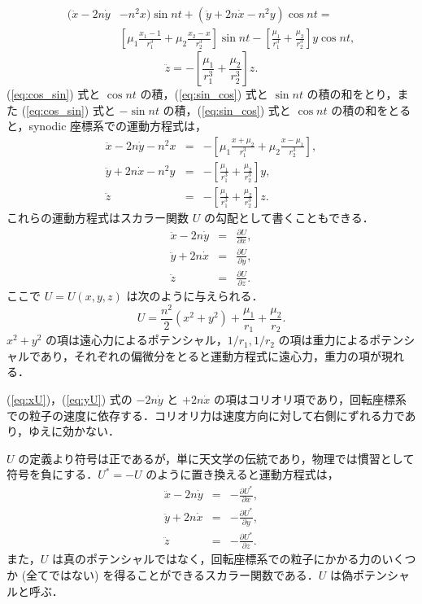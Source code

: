 \documentclass[11pt,a4paper,oneside,onecolumn]{jarticle}
\begin{document}
\begin{equation}
\begin{split}
(\ddot{x} - 2 n \dot{y} & - n^2 x) \sin nt + (\ddot{y} + 2 n \dot{x} - n^2 y) \cos nt =\\
& \left[ \mu_1 \frac{x_1 - 1}{r_1^3} + \mu_2 \frac{x_2 - x}{r_2^3} \right] \sin nt - \left[ \frac{\mu_1}{r_1^3} + \frac{\mu_2}{r_2^3} \right] y \cos nt, \label{eq:sin_cos}
\end{split}
\end{equation}
\begin{equation}
\ddot{z} = - \left[ \frac{\mu_1}{r_1^3} + \frac{\mu_2}{r_2^3} \right] z.
\end{equation}
(\ref{eq:cos_sin}) 式と $\cos nt$ の積，(\ref{eq:sin_cos}) 式と $\sin nt$ の積の和をとり，また (\ref{eq:cos_sin}) 式と $- \sin nt$ の積，(\ref{eq:sin_cos}) 式と $\cos nt$ の積の和をとると，synodic 座標系での運動方程式は，
\begin{eqnarray}
\ddot{x} - 2 n \dot{y} - n^2 x & = & - \left[ \mu_1 \frac{x + \mu_2}{r_1^3} + \mu_2 \frac{x - \mu_1}{r_2^3} \right],\\
\ddot{y} + 2 n \dot{x} - n^2 y & = & - \left[ \frac{\mu_1}{r_1^3} + \frac{\mu_2}{r_2^3} \right] y,\\
\ddot{z} & = & - \left[ \frac{\mu_1}{r_1^3} + \frac{\mu_2}{r_2^3} \right] z.
\end{eqnarray}
これらの運動方程式はスカラー関数 $U$ の勾配として書くこともできる．
\begin{eqnarray}
\ddot{x} - 2 n \dot{y} & = & \frac{\partial U}{\partial x}, \label{eq:xU}\\
\ddot{y} + 2 n \dot{x} & = & \frac{\partial U}{\partial y}, \label{eq:yU}\\
\ddot{z} & = & \frac{\partial U}{\partial z}. \label{eq:zU}
\end{eqnarray}
ここで $U = U (x, y, z)$ は次のように与えられる．
\begin{equation}
U = \frac{n^2}{2} (x^2 + y^2) + \frac{\mu_1}{r_1} + \frac{\mu_2}{r_2}. \label{eq:U}
\end{equation}
$x^2 + y^2$ の項は遠心力によるポテンシャル，$1/r_1, 1/r_2$ の項は重力によるポテンシャルであり，それぞれの偏微分をとると運動方程式に遠心力，重力の項が現れる．

(\ref{eq:xU})，(\ref{eq:yU}) 式の $- 2n \dot{y}$ と $+ 2n \dot{x}$ の項はコリオリ項であり，回転座標系での粒子の速度に依存する．コリオリ力は速度方向に対して右側にずれる力であり，ゆえに効かない．

$U$ の定義より符号は正であるが，単に天文学の伝統であり，物理では慣習として符号を負にする．$U^{\ast} = - U$ のように置き換えると運動方程式は，
\begin{eqnarray}
\ddot{x} - 2 n \dot{y} & = & - \frac{\partial U^{\ast}}{\partial x}, \label{eq:xUast}\\
\ddot{y} + 2 n \dot{x} & = & - \frac{\partial U^{\ast}}{\partial y}, \label{eq:yUast}\\
\ddot{z} & = & - \frac{\partial U^{\ast}}{\partial z}. \label{eq:zUast}
\end{eqnarray}
また，$U$ は真のポテンシャルではなく，回転座標系での粒子にかかる力のいくつか (全てではない) を得ることができるスカラー関数である．$U$ は偽ポテンシャルと呼ぶ．
\end{document}
